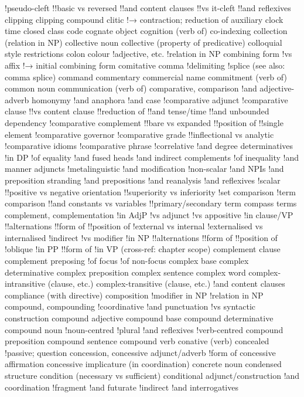 !pseudo-cleft
!!basic vs reversed
!!and content clauses
!!vs it-cleft
!!and reflexives
clipping
clipping compound
clitic
!→ contraction; reduction of auxiliary
clock time
closed class
code
cognate object
cognition (verb of)
co-indexing
collection (relation in NP)
collective noun
collective (property of predicative)
colloquial style restrictions
colon
colour
!adjective, etc.
!relation in NP
combining form
!vs affix
!→ initial combining form
comitative
comma
!delimiting
!splice (see also: comma splice)
command
commentary
commercial name
commitment (verb of)
common noun
communication (verb of)
comparative, comparison
!and adjective-adverb homonymy
!and anaphora
!and case
!comparative adjunct
!comparative clause
!!vs content clause
!!reduction of
!!and tense/time
!!and unbounded dependency
!comparative complement
!!bare vs expanded
!!position of
!!single element
!comparative governor
!comparative grade
!!inflectional vs analytic
!comparative idioms
!comparative phrase
!correlative
!and degree determinatives
!in DP
!of equality
!and fused heads
!and indirect complements
!of inequality
!and manner adjuncts
!metalinguistic
!and modification
!non-scalar
!and NPIs
!and preposition stranding
!and prepositions
!and reanalysis
!and reflexives
!scalar
!!positive vs negative orientation
!!superiority vs inferiority
!set comparison
!term comparison
!!and constants vs variables
!!primary/secondary term
compass terms
complement, complementation
!in AdjP
!vs adjunct
!vs appositive
!in clause/VP
!!alternations
!!form of
!!position of
!external vs internal
!externalised vs internalised
!indirect
!vs modifier
!in NP
!!alternations
!!form of
!!position of
!oblique
!in PP
!!form of
!in VP (cross-ref: chapter scope)
complement clause
complement preposing
!of focus
!of non-focus
complex base
complex determinative
complex preposition
complex sentence
complex word
complex-intransitive (clause, etc.)
complex-transitive (clause, etc.)
!and content clauses
compliance (with directive)
composition
!modifier in NP
!relation in NP
compound, compounding
!coordinative
!and punctuation
!vs syntactic construction
compound adjective
compound base
compound determinative
compound noun
!noun-centred
!plural
!and reflexives
!verb-centred
compound preposition
compound sentence
compound verb
conative (verb)
concealed
!passive; question
concession, concessive adjunct/adverb
!form of
concessive affirmation
concessive implicature (in coordination)
concrete noun
condensed structure
condition (necessary vs sufficient)
conditional adjunct/construction
!and coordination
!fragment
!and futurate
!indirect
!and interrogatives
